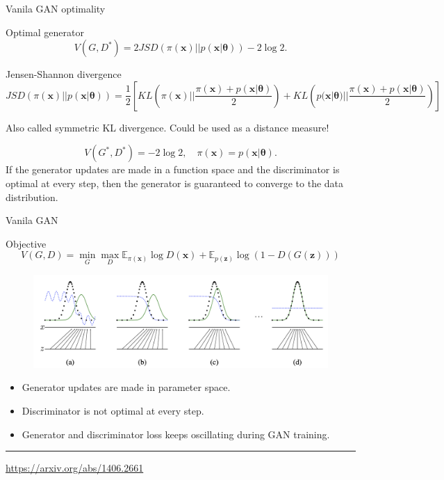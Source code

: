 \documentclass{beamer}
\newcommand{\bx}{\mathbf{x}}
\newcommand{\bz}{\mathbf{z}}
\newcommand{\bbE}{\mathbb{E}}
\newcommand{\btheta}{\boldsymbol{\theta}}
\begin{document}
\begin{frame}{Vanila GAN optimality}
	\begin{block}{Optimal generator}
		\vspace{-0.2cm}
		\[
			V(G, D^*)  = 2JSD(\pi(\bx) || p(\bx | \btheta)) - 2\log 2.
		\]
	\end{block}
	\begin{block}{Jensen-Shannon divergence}
		\vspace{-0.2cm}
		\footnotesize
		\[
			JSD(\pi(\bx) || p(\bx | \btheta)) = \frac{1}{2} \left[KL \left(\pi(\bx) || \frac{\pi(\bx) + p(\bx | \btheta)}{2}\right) + KL \left(p(\bx | \btheta) || \frac{\pi(\bx) + p(\bx | \btheta)}{2}\right) \right]
		\]
	\end{block}
	Also called symmetric KL divergence. Could be used as a distance measure!
	
	\[
		V(G^*, D^*) = -2\log 2, \quad \pi(\bx) = p(\bx | \btheta).
	\]
	If the generator updates are made in a function space and the discriminator is optimal at every step, then the generator is guaranteed to converge to the data distribution.
\end{frame}
\begin{frame}{Vanila GAN}
	\begin{block}{Objective}
		\vspace{-0.4cm}
		\[
		V(G, D) = \min_{G} \max_D \bbE_{\pi(\bx)} \log D(\bx) + \bbE_{p(\bz)} \log (1 - D(G(\bz)))
		\]
		\vspace{-0.4cm}
	\end{block}

	\begin{figure}
		\centering
		\includegraphics[width=1.0\linewidth]{figs/gan_1}
	\end{figure}
	\begin{itemize}
		\item Generator updates are made in parameter space.
		\item Discriminator is not optimal at every step.
		\item Generator and discriminator loss keeps oscillating during GAN training.
	\end{itemize}
	\vfill
	\hrule\medskip
	{\scriptsize \href{https://arxiv.org/abs/1406.2661}{https://arxiv.org/abs/1406.2661}}
\end{frame}
\end{document}
